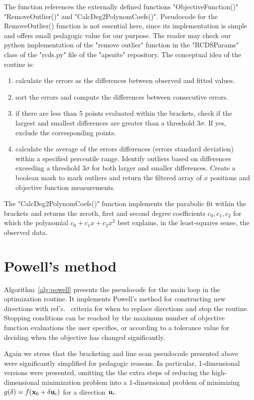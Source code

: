 The function references the externally defined functions "ObjectiveFunction()" "RemoveOutlier()" and "CalcDeg2PolynomCoefs()". Pseudocode for the RemoveOutlier() function is not essential here, since its implementation is simple and offers small pedagogic value for our purpose. The reader may check our python implementation of  the "remove outlier" function in the "RCDSParams" class of the "rcds.py" file of the "apsuite" repository. The conceptual idea of the routine is:
\begin{enumerate}
    \item calculate the errors as the differences between observed and fitted values.
    \item sort the errors and compute the differences between consecutive errors.
    \item if there are less than 5 points evaluated within the brackets, check if the largest and smallest differences are greater than a threshold $3\sigma$. If yes, exclude the corresponding points.
    \item calculate the average of the errors differences (errors standard deviation) within a specified percentile range. Identify outliers based on differences exceeding a threshold $3\sigma$ for both larger and smaller differences. Create a boolean mask to mark outliers and return the filtered array of $x$ positions and objective function measurements.
\end{enumerate}

The "CalcDeg2PolynomCoefs()" function implements the parabolic fit within the brackets and returns the zeroth, first and second degree coefficients $c_0, c_1, c_2$ for which the polynomial $c_0 + c_1x + c_2 x^2$ best explains, in the least-squares sense, the observed data.

\section{Powell's method}
Algorithm~\ref{alg:powell} presents the pseudocode for the main loop in the optimization routine. It implements Powell's method for constructing new directions with ref's.~\cite[section 10.7]{press_numerical_2007} criteria for when to replace directions and stop the routine. Stopping conditions can be reached by the maximum number of objective function evaluations the user specifies, or according to a tolerance value for deciding when the objective has changed significantly.

Again we stress that the bracketing and line scan pseudocode presented above were significantly simplified for pedagogic reasons. In particular, 1-dimensional versions were presented, omitting the the extra steps of reducing the high-dimensional minimization problem into a 1-dimensional problem of minimizing $g(\delta) = f(\vb{x}_0 + \delta \vb{u}_i)$ for a direction $\vb{u}_i$.

